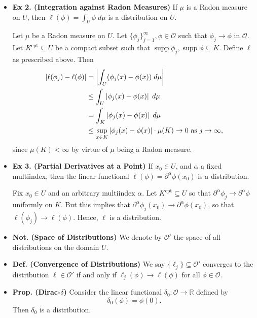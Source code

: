 \documentclass{article}
\begin{document}
\begin{itemize}
		\item \textbf{Ex 2. (Integration against Radon Measures)} 	If $\mu$ is a Radon measure on $U$, then $\ell(\phi) = \int_{U}\phi\;d\mu$ is a distribution on $U$. 
		
		{\color{orange}
			Let $\mu$ be a Radon measure on $U$. Let $\{\phi_{j}\}_{j = 1}^{\infty}, \phi \in \mathcal{O}$ such that $\phi_{j} \to \phi$ in $\mathcal{O}$. Let $K^{\text{cpt}} \subseteq U$ be a compact subset such that $\operatorname{supp}{\phi_{j}}, \operatorname{supp}{\phi} \subseteq K$. Define $\ell$ as prescribed above. Then 
			\begin{align}
				\begin{split}
					\left| \ell(\phi_{j}) - \ell(\phi) \right| &= \left| \int_{U}(\phi_{j}(x) - \phi(x)) \;d\mu \right| \\
					&\leq \int_{U}\left| \phi_{j}(x) - \phi(x) \right|\;d\mu \\
					&= \int_{K}\left| \phi_{j}(x) - \phi(x) \right|\;d\mu \\
					&\leq \sup_{x \in K}|\phi_{j}(x) - \phi(x)| \cdot \mu(K) \to 0 \text{ as $j \to \infty$}, 
				\end{split}
			\end{align}
			since $\mu(K) <\infty$ by virtue of $\mu$ being a Radon measure. 
		}
		
		\item \textbf{Ex 3. (Partial Derivatives at a Point)} If $x_{0} \in U$, and $\alpha$ a fixed multiindex, then the linear functional $\ell(\phi) = \partial^{\alpha}\phi(x_{0})$ is a distribution. 
		
		{\color{orange}
			Fix $x_{0} \in U$ and an arbitrary multiindex $\alpha$. Let $K^{\text{cpt}} \subseteq U$ so that $\partial^{\alpha}\phi_{j} \to \partial^{\alpha}\phi$ uniformly on $K$. But this implies that $\partial^{\alpha}\phi_{j}(x_{0}) \to \partial^{\alpha}\phi(x_{0})$, so that $\ell(\phi_{j}) \to\ell(\phi)$. Hence, $\ell$ is a distribution. 
		}
		
		\item \textbf{Not. (Space of Distributions)} We denote by $\mathcal{O}'$ the space of all distributions on the domain $U$. 
		
		\item \textbf{Def. (Convergence of Distributions)} We say $\{\ell_{j}\} \subseteq \mathcal{O}'$ converges to the distribution $\ell \in \mathcal{O}'$ if and only if $\ell_{j}(\phi) \to \ell(\phi)$ for all $\phi \in \mathcal{O}$. 
		
		\item \textbf{Prop. (Dirac-$\delta$)} Consider the linear functional $\delta_{0}: \mathcal{O} \to \mathbb{R}$ defined by 
		\begin{equation}
			\delta_{0}(\phi) = \phi(0). 
		\end{equation}
		Then $\delta_{0}$ is a distribution. 
		

\end{itemize}
\end{document}
